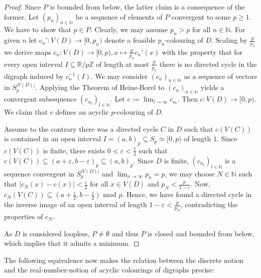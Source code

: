 \documentclass[fontsize=11pt,a4paper,DIV12]{scrartcl}
\theoremstyle{meiner}
\theoremstyle{definition}
\begin{document}
\begin{proof}
  Since $P$ is bounded from below, the latter claim is a consequence
  of the former. Let $(p_n)_{n \in \mathbb{N}}$ be a sequence of
  elements of $P$ convergent to some $p \ge 1$. We have to show that
  $p \in P$. Clearly, we may assume $p_n>p$ for all $n \in
  \mathbb{N}$.  For given $n$ let $c_n':V(D) \rightarrow [0,p_n)$
  denote a feasible $p_n$-colouring of $D$.  Scaling by
  $\frac{p}{p_n}$ we derive maps $c_n:V(D) \rightarrow [0,p),
  x\mapsto \frac{p}{p_n}c_n'(x)$ with the property that for every
  open interval $I \subseteq \mathbb{R}/p\mathbb{Z}$ of length at most
  $\frac{p}{p_n}$ there is no directed cycle in the digraph induced by
  $c_n^{-1}(I)$.
  We may consider $(c_n)_{n \in \mathbb{N}}$ as a sequence of vectors
  in $S_p^{|V(D)|}$. Applying the Theorem of Heine-Borel to $(c_n)_{n
    \in \mathbb{N}}$ yields a convergent subsequence $(c_{n_l})_{l \in
    \mathbb{N}}$. Let $c:=\lim_{l \rightarrow \infty}{c_{n_l}}$. Then
  $c:V(D) \rightarrow [0,p)$.  We claim that $c$ defines an
  acyclic $p$-colouring of $D$. 

  Assume to the contrary there was a directed cycle $C$ in $D$ such
  that $c(V(C))$ is contained in an open interval $I=(a,b)_p \subseteq
  S_p \simeq [0,p)$ of length $1$. Since $c(V(C))$ is finite, there
  exists $0<\varepsilon<\frac{1}{2}$ such that $c(V(C)) \subseteq
  (a+\varepsilon,b-\varepsilon)_p \subseteq (a,b)_p$.  Since $D$ is
  finite, $(c_{n_l})_{l \in \mathbb{N}}$ is a sequence convergent in
  ${S_p^{|V(D)|}}$ and $\lim_{n \to \infty}p_n=p$, we may choose $N
  \in \mathbb{N}$ such that $|c_{N}(x) - c(x)|<\frac{\varepsilon}{2}$
  for all $x \in V(D)$ and $p_{N}<\frac{p}{1-\varepsilon}$.  Now,
  $c_N(V(C)) \subseteq (a+\frac{\varepsilon}{2},b -\frac{\varepsilon}{2})
  \text{ mod } p$. Hence, we have found a directed cycle in the inverse
  image of an open interval of length $1-\varepsilon < \frac{p}{p_N}$,
  contradicting the properties of $c_N$.
  

  As $D$ is considered loopless, $P \neq \emptyset$ and thus $P$ is closed and
  bounded from below, which implies that it admits a minimum.
\end{proof}


The following equivalence now makes the relation between the discrete notion and the real-number-notion of acyclic colourings of digraphs precise:
\end{document}
